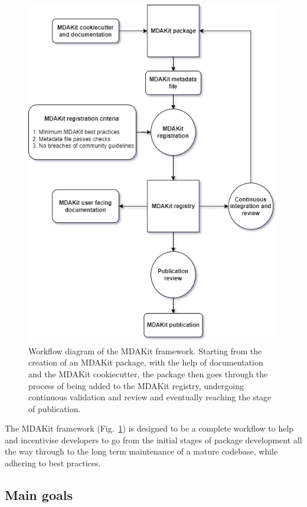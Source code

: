 \documentclass[9pt,whitepaper]{livecoms}
\begin{document}
\begin{figure}[hbt!]
    \centering
    \includegraphics[width=\linewidth]{figures/MDAKitFramework.png}
    \caption{Workflow diagram of the MDAKit framework. Starting from the creation of an MDAKit package, with the help of documentation and the MDAKit cookiecutter, the package then goes through the process of being added to the MDAKit registry, undergoing continuous validation and review and eventually reaching the stage of publication.}
    \label{fig:workflow}
\end{figure}

The MDAKit framework (Fig.~\ref{fig:workflow}) is designed to be a complete workflow to help and incentivise developers to go from the initial stages of package development all the way through to the long term maintenance of a mature codebase, while adhering to best practices.


\subsection{Main goals}
\label{sec:maingoals}
\end{document}
